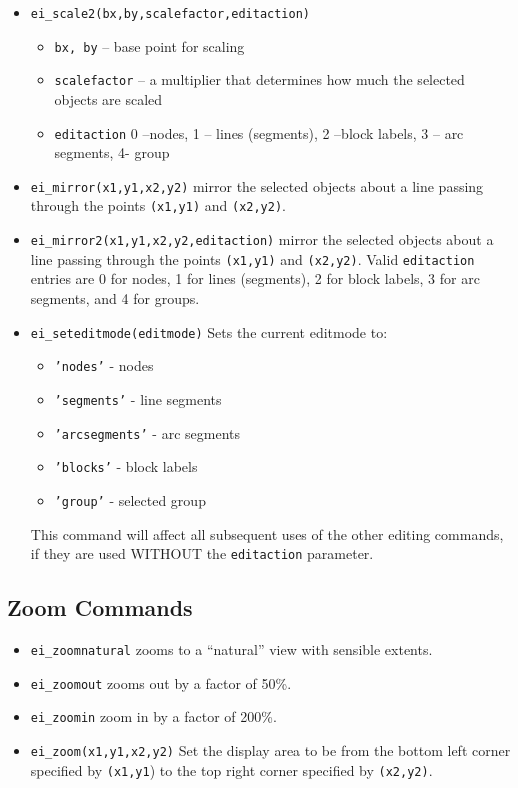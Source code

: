 \begin{itemize}
\item{\tt ei\_scale2(bx,by,scalefactor,editaction)}
        \begin{itemize}
        \item{\tt bx, by} -- base point for scaling
        \item{\tt scalefactor} -- a multiplier that determines how
        much the selected objects are scaled
        \item{\tt editaction}  0 --nodes, 1 -- lines (segments), 2 --block labels, 3 -- arc
                segments, 4- group
        \end{itemize}


\item{\tt ei\_mirror(x1,y1,x2,y2)}
mirror the selected objects about a line passing through the points
{\tt (x1,y1)} and {\tt (x2,y2)}.

\item{\tt ei\_mirror2(x1,y1,x2,y2,editaction)}
mirror the selected objects about a line passing through the points
{\tt (x1,y1)} and {\tt (x2,y2)}. Valid {\tt editaction} entries are
0 for nodes, 1 for lines (segments), 2 for block labels, 3 for arc
segments, and 4 for groups.

\item{\tt ei\_seteditmode(editmode)}
Sets the current editmode to:
        \begin{itemize}
        \item{\tt 'nodes'} - nodes
        \item{\tt 'segments'} - line segments
        \item{\tt 'arcsegments'} - arc segments
        \item{\tt 'blocks'} - block labels
        \item{\tt 'group'} - selected group
        \end{itemize}
This command will affect all subsequent uses of the other editing
commands, if they are used WITHOUT the {\tt editaction} parameter.
\end{itemize}

\subsection{Zoom Commands}

\begin{itemize}
\item \texttt{ei\_zoomnatural} zooms to a ``natural'' view with sensible extents.

\item \texttt{ei\_zoomout} zooms out by a factor of 50{\%}.

\item \texttt{ei\_zoomin} zoom in by a factor of 200{\%}.

\item \texttt{ei\_zoom(x1,y1,x2,y2)} Set the display area to be from the bottom left
corner specified by \texttt{(x1,y1}) to the top right corner
specified by \texttt{(x2,y2)}.
\end{itemize}

